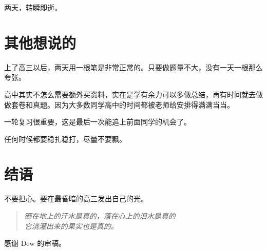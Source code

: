 \documentclass[UTF8,11pt,a4paper]{ctexart}
\begin{document}
		两天，转瞬即逝。
			
	\section{其他想说的}
		上了高三以后，两天用一根笔是非常正常的。只要做题量不大，没有一天一根那么夸张。
		
		高中其实不怎么需要额外买资料，实在是学有余力可以多做总结，再有时间就去做做套卷和真题。因为大多数同学高中的时间都被老师给安排得满满当当。
		
		一轮复习很重要，这是最后一次能追上前面同学的机会了。
		
		任何时候都要稳扎稳打，尽量不要飘。
	\section{结语}
		不要担心。要在最昏暗的高三发出自己的光。
		
		\begin{quote}
		\it 砸在地上的汗水是真的，落在心上的泪水是真的\\
		它浇灌出来的果实也是真的。
		\end{quote}
		
		感谢 Dew 的审稿。
		
\end{document}

